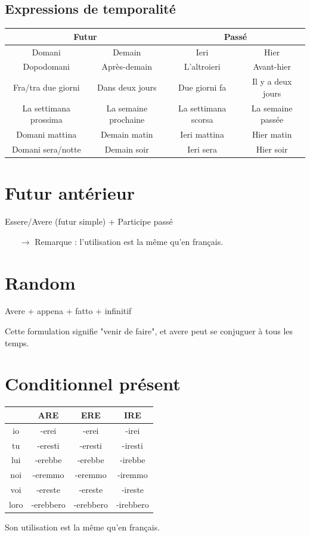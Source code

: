 \documentclass[12pt, openany]{report}
\begin{document}
\subsection{Expressions de temporalité}
\begin{center}
    \begin{tabular}{c|c|c|c}
        \multicolumn{2}{c|}{\textbf{Futur}} & \multicolumn{2}{c}{\textbf{Passé}} \\ \hline
        Domani & Demain & Ieri & Hier \\
        Dopodomani & Après-demain & L'altroieri & Avant-hier \\
        Fra/tra due giorni & Dans deux jours & Due giorni fa & Il y a deux jours \\
        La settimana prossima & La semaine prochaine & La settimana scorsa & La semaine passée \\
        Domani mattina & Demain matin & Ieri mattina & Hier matin \\
        Domani sera/notte & Demain soir & Ieri sera & Hier soir \\
    \end{tabular}
\end{center}
\section{Futur antérieur}
\begin{center}
    Essere/Avere (futur simple) + Participe passé 
\end{center}
\begin{itemize}
    \item [$\to$] Remarque : l'utilisation est la même qu'en français.
\end{itemize}
\section{Random}
\begin{center}
    Avere + appena + fatto + infinitif 
\end{center}
Cette formulation signifie "venir de faire", et avere peut se conjuguer à tous les temps.
\section{Conditionnel présent}
\begin{center}
    \begin{tabular}{c|c|c|c}
        & ARE & ERE & IRE\\ \hline
        io & -erei & -erei & -irei\\
        tu & -eresti & -eresti & -iresti\\
        lui & -erebbe & -erebbe & -irebbe\\
        noi & -eremmo & -eremmo & -iremmo\\
        voi & -ereste & -ereste & -ireste\\
        loro & -erebbero & -erebbero & -irebbero\\
    \end{tabular}
\end{center} 
Son utilisation est la même qu'en français. 
\end{document}
